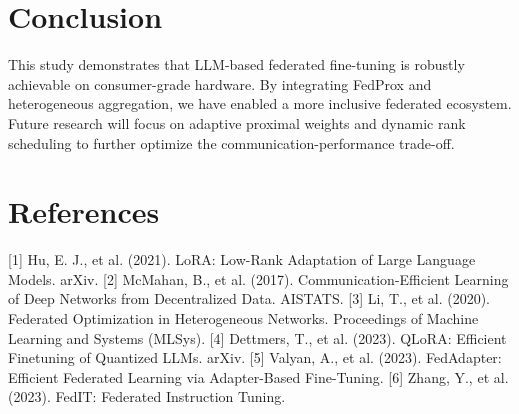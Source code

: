 \documentclass[twocolumn]{article}
\begin{document}
\section{Conclusion}
This study demonstrates that LLM-based federated fine-tuning is robustly achievable on consumer-grade hardware. By integrating FedProx and heterogeneous aggregation, we have enabled a more inclusive federated ecosystem. Future research will focus on adaptive proximal weights and dynamic rank scheduling to further optimize the communication-performance trade-off.

\section*{References}
[1] Hu, E. J., et al. (2021). LoRA: Low-Rank Adaptation of Large Language Models. arXiv.
[2] McMahan, B., et al. (2017). Communication-Efficient Learning of Deep Networks from Decentralized Data. AISTATS.
[3] Li, T., et al. (2020). Federated Optimization in Heterogeneous Networks. Proceedings of Machine Learning and Systems (MLSys).
[4] Dettmers, T., et al. (2023). QLoRA: Efficient Finetuning of Quantized LLMs. arXiv.
[5] Valyan, A., et al. (2023). FedAdapter: Efficient Federated Learning via Adapter-Based Fine-Tuning.
[6] Zhang, Y., et al. (2023). FedIT: Federated Instruction Tuning.
\end{document}
